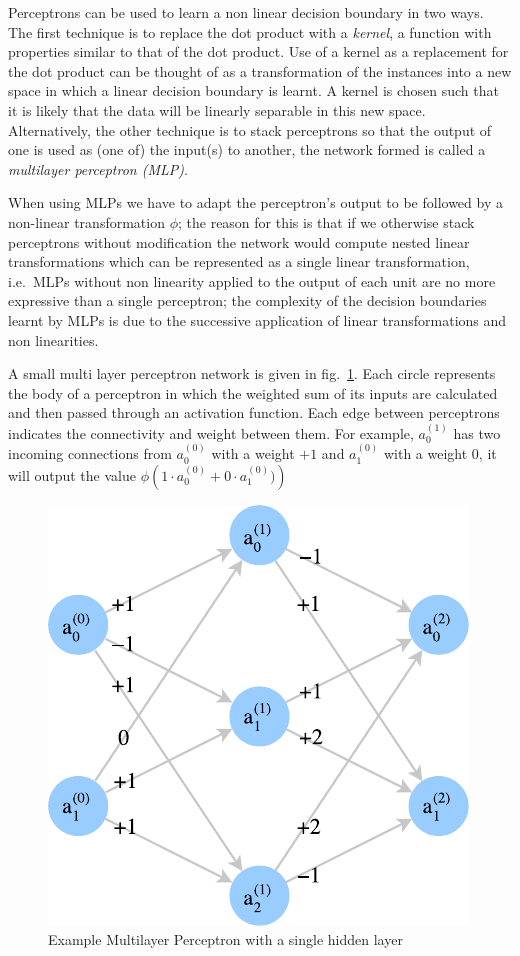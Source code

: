 \documentclass[A4paper,draft]{scrreprt}
\newcommand{\neuron}[2]{a_{#2}^{(#1)}}
\begin{document}
Perceptrons can be used to learn a non linear decision boundary in two
ways. The first technique is to replace the dot product with a
\emph{kernel}, a function with properties similar to that of the dot
product. Use of a kernel as a replacement for the dot product can be
thought of as a transformation of the instances into a new space in
which a linear decision boundary is learnt. A kernel is chosen such that
it is likely that the data will be linearly separable in this new space.
Alternatively, the other technique is to stack perceptrons so that the
output of one is used as (one of) the input(s) to another, the network
formed is called a \emph{multilayer perceptron (MLP)}.

When using MLPs we have to adapt the perceptron's output to be followed
by a non-linear transformation \(\phi\); the reason for this is that if
we otherwise stack perceptrons without modification the network would
compute nested linear transformations which can be represented as a
single linear transformation, i.e.~MLPs without non linearity applied to
the output of each unit are no more expressive than a single perceptron;
the complexity of the decision boundaries learnt by MLPs is due to the
successive application of linear transformations and non linearities.

A small multi layer perceptron network is given in
fig.~\ref{fig:ann-example}. Each circle represents the body of a
perceptron in which the weighted sum of its inputs are calculated and
then passed through an activation function. Each edge between
perceptrons indicates the connectivity and weight between them. For
example, \(\neuron{1}{0}\) has two incoming connections from
\(\neuron{0}{0}\) with a weight \(+1\) and \(\neuron{0}{1}\) with a
weight \(0\), it will output the value
\({\phi\left(1 \cdot \neuron{0}{0} + 0 \cdot \neuron{0}{1})\right)}\)

\begin{figure}
\centering
\includegraphics{media/images/ann-example.pdf}
\caption{Example Multilayer Perceptron with a single hidden
layer}\label{fig:ann-example}
\end{figure}
\end{document}
